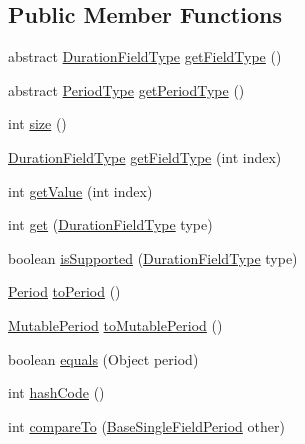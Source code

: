 \subsection*{Public Member Functions}
\begin{DoxyCompactItemize}
\item 
abstract \hyperlink{classorg_1_1joda_1_1time_1_1_duration_field_type}{Duration\-Field\-Type} \hyperlink{classorg_1_1joda_1_1time_1_1base_1_1_base_single_field_period_aecf346c3080e43febb218eef98f00963}{get\-Field\-Type} ()
\item 
abstract \hyperlink{classorg_1_1joda_1_1time_1_1_period_type}{Period\-Type} \hyperlink{classorg_1_1joda_1_1time_1_1base_1_1_base_single_field_period_adec745b2f348aa2d2748334f61fd0df5}{get\-Period\-Type} ()
\item 
int \hyperlink{classorg_1_1joda_1_1time_1_1base_1_1_base_single_field_period_a897bd25b3967a600d67778212b27ef98}{size} ()
\item 
\hyperlink{classorg_1_1joda_1_1time_1_1_duration_field_type}{Duration\-Field\-Type} \hyperlink{classorg_1_1joda_1_1time_1_1base_1_1_base_single_field_period_a0ef5f11ed6bb37845b7ed7ae1ab5a11b}{get\-Field\-Type} (int index)
\item 
int \hyperlink{classorg_1_1joda_1_1time_1_1base_1_1_base_single_field_period_a50f329bede939a4e6a1f8fb85167339f}{get\-Value} (int index)
\item 
int \hyperlink{classorg_1_1joda_1_1time_1_1base_1_1_base_single_field_period_a302a562e8aa86c4b2ea421cee511322d}{get} (\hyperlink{classorg_1_1joda_1_1time_1_1_duration_field_type}{Duration\-Field\-Type} type)
\item 
boolean \hyperlink{classorg_1_1joda_1_1time_1_1base_1_1_base_single_field_period_aadaa51788e3e81cdca7052f6567487eb}{is\-Supported} (\hyperlink{classorg_1_1joda_1_1time_1_1_duration_field_type}{Duration\-Field\-Type} type)
\item 
\hyperlink{classorg_1_1joda_1_1time_1_1_period}{Period} \hyperlink{classorg_1_1joda_1_1time_1_1base_1_1_base_single_field_period_a0f7b2baca22b5416a196f787e9cef910}{to\-Period} ()
\item 
\hyperlink{classorg_1_1joda_1_1time_1_1_mutable_period}{Mutable\-Period} \hyperlink{classorg_1_1joda_1_1time_1_1base_1_1_base_single_field_period_a1b3c0160fa7e5e404d9cc2ae008eb939}{to\-Mutable\-Period} ()
\item 
boolean \hyperlink{classorg_1_1joda_1_1time_1_1base_1_1_base_single_field_period_a35a80cfdb713f6ce995d3cf839186cd5}{equals} (Object period)
\item 
int \hyperlink{classorg_1_1joda_1_1time_1_1base_1_1_base_single_field_period_ab12744e48b85a2883813d22faac43380}{hash\-Code} ()
\item 
int \hyperlink{classorg_1_1joda_1_1time_1_1base_1_1_base_single_field_period_a29161ea29b2a7c4aa08d7a28298f823d}{compare\-To} (\hyperlink{classorg_1_1joda_1_1time_1_1base_1_1_base_single_field_period}{Base\-Single\-Field\-Period} other)
\end{DoxyCompactItemize}
